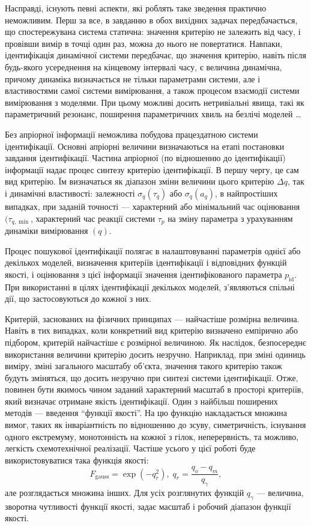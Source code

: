 \documentclass[a4paper,13pt]{atuaref}
\begin{document}
Насправді, існують певні аспекти, які роблять таке зведення практично
неможливим. Перш за все, в завданню в обох вихідних задачах передбачається, що
спостережувана система статична: значення критерію не залежить від часу, і
провівши вимір в точці один раз, можна до нього не повертатися. Навпаки,
ідентифікація динамічної системи передбачає, що значення критерію, навіть після
будь-якого усереднення на кінцевому інтервалі часу, є величина динамічна,
причому динаміка визначається не тільки параметрами системи, але і
властивостями самої системи вимірювання, а також процесом взаємодії системи
вимірювання з моделями. При цьому можливі досить нетривіальні явища, такі як
параметричний резонанс, поширення параметричних хвиль на безлічі моделей \ldots

Без апріорної інформації неможлива побудова працездатною системи ідентифікації.
Основні апріорні величини визначаються на етапі постановки завдання
ідентифікації. Частина апріорної (по відношенню до ідентифікації) інформації
надає процес синтезу критерію ідентифікації. В першу чергу, це сам вид
критерію. Їм визначаться як діапазон зміни величини цього критерію
$ \Delta q$, так і динамічні властивості: залежності
$ \sigma_q (\tau_q) $ або $\sigma_q(a_q) $,
в найпростіших випадках, при заданій точності --- характерний або
мінімальний час оцінювання $(\tau_{q, \min} $,
характерний час реакції
системи $ \tau_p $ на зміну параметра з урахуванням динаміки вимірювання $(q)$.

Процес пошукової ідентифікації полягає в налаштовуванні параметрів однієї або
декількох моделей, визначення критеріїв ідентифікації і відповідних функцій
якості, і оцінювання з цієї інформації значення ідентифікованого параметра
$ p_\mathrm{id}$. При використанні в цілях
ідентифікації декількох моделей, з'являються спільні дії, що застосовуються до
кожної з них.

Критерій, заснованих на фізичних принципах --- найчастіше розмірна величина.
Навіть в тих випадках, коли конкретний вид критерію визначено емпірично або
підбором, критерій найчастіше є розмірної величиною. Як наслідок, безпосереднє
використання величини критерію досить незручно. Наприклад, при зміні одиниць
виміру, зміні загального масштабу об'єкта, значення такого критерію також
будуть зміняться, що досить незручно при синтезі системи ідентифікації. Отже,
повинен бути якимось чином заданий характерний масштаб в просторі критеріїв,
який визначає отримане якість ідентифікації.
Один з найбільш поширених методів --- введення ``функції якості''.
На цю функцію накладається множина вимог, таких як
інваріантність по відношенню до зсуву, симетричність,
існування одного екстремуму, монотонність на кожної з гілок,
неперервність, та можливо, легкість схемотехнічної реалізації.
Частіше усього у цієї роботі буде використовуватися така функція якості:
\begin{equation}
  F_{\mathrm{gauss}} = \exp( - q_r^2 ),
  \;
  q_r = \frac{q_o - q_m}{q_\gamma},
\label{atu:eq:F_gauss}
\end{equation}
%
але розглядається множина інших.
Для усіх розглянутих функцій $ q_\gamma $ --- величина,
зворотна чутливості функції якості, задає масштаб і робочий діапазон функції якості.
\end{document}
